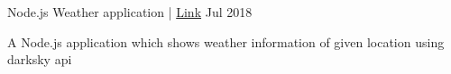 \begin{cventries}
    \cventry
    {\textnormal{Node.js}} %
    {Weather application | \href{https://github.com/Rpmalukani22/weather-app}{ Link}} %
    { } %
    {Jul 2018} %
    {
      \begin{cvitems} %
        \item {
      A Node.js application which shows weather information of given location using darksky api
 }
      \end{cvitems}
  } 
\end{cventries}
